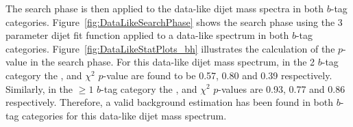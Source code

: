 The search phase is then applied to the data-like dijet mass spectra
in both $b$-tag categories.
Figure~\ref{fig:DataLikeSearchPhase} shows the search phase 
using the 3 parameter dijet fit function
applied to a  data-like spectrum in both $b$-tag categories.
Figure~\ref{fig:DataLikeStatPlots_bh} illustrates the calculation of the \bh{} $p$-value in the search phase.
For this data-like dijet mass spectrum, in the 2 $b$-tag category
the \bh{}, \dhunt{} and  $\chi^{2}$ \mbox{$p$-value} are found to be
0.57, 0.80 and 0.39 respectively.
Similarly, in the $\geq1$ $b$-tag category the
\bh{}, \dhunt{} and  $\chi^{2}$ \mbox{$p$-value}s are
0.93, 0.77 and 0.86 respectively.
Therefore, a valid background estimation has been found in both $b$-tag categories for this data-like dijet mass spectrum.


